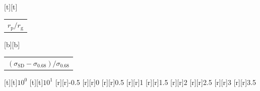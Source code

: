 %    
%
%
\begin{psfrags}%
\psfragscanon%
%
[t][t]{\color[rgb]{0,0,0}\setlength{\tabcolsep}{0pt}\begin{tabular}{c}{\Large$r_\mathrm{p}/r_\mathrm{g}$}\end{tabular}}%
[b][b]{\color[rgb]{0,0,0}\setlength{\tabcolsep}{0pt}\begin{tabular}{c}{\Large$(\sigma_\mathrm{SD}-\sigma_{0.68})/\sigma_{0.68}$}\end{tabular}}%
%
[t][t]{$10^{0}$}%
[t][t]{$10^{1}$}%
%
[r][r]{-0.5}%
[r][r]{0}%
[r][r]{0.5}%
[r][r]{1}%
[r][r]{1.5}%
[r][r]{2}%
[r][r]{2.5}%
[r][r]{3}%
[r][r]{3.5}%
%
%
\end{psfrags}%
%
